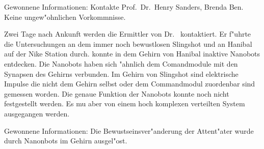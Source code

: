 \begin{remarks}
	Gewonnene Informationen: Kontakte Prof.~Dr.~Henry Sanders, Brenda Ben. Keine ungew"ohnlichen Vorkommnisse.
\end{remarks}



Zwei Tage nach Ankunft werden die Ermittler von Dr.~  kontaktiert. Er f"uhrte die Untersuchungen an dem immer noch bewustlosen Slingshot und an Hanibal auf der Nike Station durch.   konnte in dem Gehirn von Hanibal inaktive Nanobots entdecken. Die Nanobots haben sich "ahnlich dem Comandmodule mit den Synapsen des Gehirns verbunden. Im Gehirn von Slingshot sind elektrische Impulse die nicht dem Gehirn selbst oder dem Commandmodul zuordenbar sind gemessen worden. Die genaue Funktion der Nanobots konnte noch nicht festgestellt werden. Es mu\3 aber von einem hoch komplexen verteilten System ausgegangen werden.

\begin{remarks}
	Gewonnene Informationen: Die Bewustseinsver"anderung der Attent"ater wurde durch Nanonbots im Gehirn ausgel"ost.
\end{remarks}



